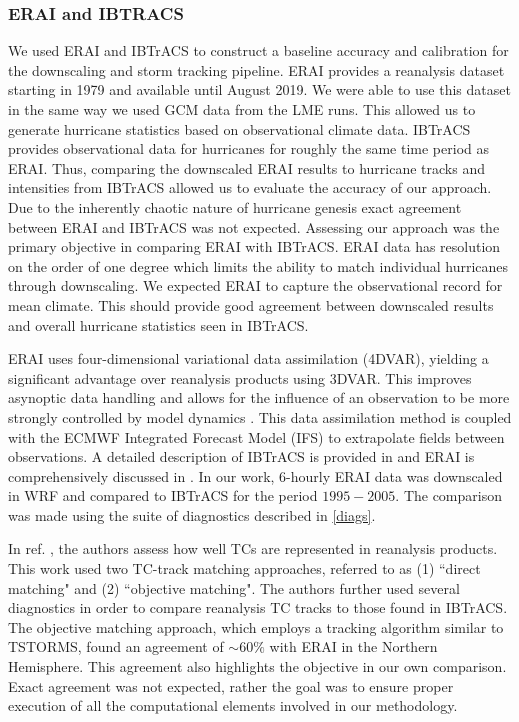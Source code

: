\documentclass[smallextended]{svjour3}       %
\begin{document}
\subsubsection{ERAI and IBTRACS}
\label{erai}
We used ERAI and IBTrACS to construct a baseline accuracy and calibration for the downscaling and storm tracking pipeline. ERAI provides a reanalysis dataset starting in 1979 and available until August 2019. We were able to use this dataset in the same way we used GCM data from the LME runs. This allowed us to generate hurricane statistics based on observational climate data. IBTrACS provides observational data for hurricanes for roughly the same time period as ERAI. Thus, comparing the downscaled ERAI results to hurricane tracks and intensities from IBTrACS allowed us to evaluate the accuracy of our approach. Due to the inherently chaotic nature of hurricane genesis exact agreement between ERAI and IBTrACS was not expected. Assessing our approach was the primary objective in comparing ERAI with IBTrACS. ERAI data has resolution on the order of one degree which limits the ability to match individual hurricanes through downscaling. We expected ERAI to capture the observational record for mean climate. This should provide good agreement between downscaled results and overall hurricane statistics seen in IBTrACS. 
\par
ERAI uses four-dimensional variational data assimilation (4DVAR), yielding a significant advantage over reanalysis products using 3DVAR. This improves asynoptic data handling and allows for the influence of an observation to be more strongly controlled by model dynamics \cite{tc_reanal:2}. This data assimilation method is coupled with the ECMWF Integrated Forecast Model (IFS) to extrapolate fields between observations. A detailed description of IBTrACS is provided in \cite{ibtracs} and ERAI is comprehensively discussed in \cite{erai_reanal}. In our work, $6$-hourly ERAI data was downscaled in WRF and compared to IBTrACS for the period $1995-2005$. The comparison was made using the suite of diagnostics described in \ref{diags}. 
\par
In ref. \cite{hodges2017well}, the authors assess how well TCs are represented in reanalysis products. This work used two TC-track matching approaches, referred to as (1) ``direct matching" and (2) ``objective matching". The authors further used several diagnostics in order to compare reanalysis TC tracks to those found in IBTrACS. The objective matching approach, which employs a tracking algorithm similar to TSTORMS, found an agreement of ${\sim}60\%$ with ERAI in the Northern Hemisphere. This agreement also highlights the objective in our own comparison. Exact agreement was not expected, rather the goal was to ensure proper execution of all the computational elements involved in our methodology. 
\end{document}
